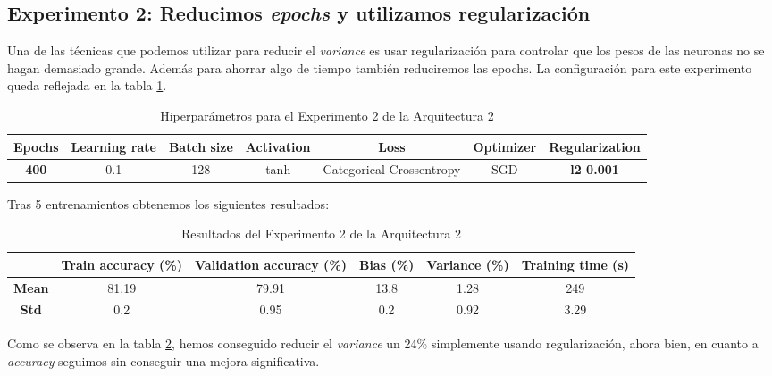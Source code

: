 \documentclass{article}
\begin{document}
			\newpage
			
			
		\subsection{Experimento 2: Reducimos \textit{epochs} y utilizamos regularizaci\'on}
		\label{d-s-a2-e2}
			Una de las t\'ecnicas que podemos utilizar para reducir el \textit{variance} es usar regularizaci\'on para controlar que los pesos de las neuronas no se hagan demasiado grande. Adem\'as para ahorrar algo de tiempo tambi\'en reduciremos las epochs. La configuraci\'on para este experimento queda reflejada en la tabla \ref{tab:hip-d-a2-e2}.
			\begin{table}[!h]
				\begin{center}
					\begin{tabular}{| c | c | c | c | c | c | c |}
						\textbf{Epochs} & \textbf{Learning rate} & \textbf{Batch size} & \textbf{Activation} & \textbf{Loss} & \textbf{Optimizer} & \textbf{Regularization} \\ \hline
						\textbf{400} & 0.1 & 128 & tanh & Categorical Crossentropy & SGD & \textbf{l2 0.001}
					\end{tabular}
					\caption{Hiperpar\'ametros para el Experimento 2 de la Arquitectura 2}
					\label{tab:hip-d-a2-e2}
				\end{center}
			\end{table}
			
			Tras 5 entrenamientos obtenemos los siguientes resultados:
			
			\begin{table}[!h]
				\begin{center}
					\begin{tabular}{ c | c | c | c | c | c |}
						\ & \textbf{Train accuracy (\%)} & \textbf{Validation accuracy (\%)} & \textbf{Bias (\%)} & \textbf{Variance (\%)} & \textbf{Training time (s)} \\ \hline
						\textbf{Mean} & 81.19 & 79.91 & 13.8 & 1.28 & 249\\ \hline
						\textbf{Std} & 0.2 & 0.95 & 0.2 & 0.92 & 3.29 \\ \hline
					\end{tabular}
					\caption{Resultados del Experimento 2 de la Arquitectura 2}
					\label{tab:res-d-a2-e2}
				\end{center}
			\end{table}
			
			Como se observa en la tabla \ref{tab:res-d-a2-e2}, hemos conseguido reducir el \textit{variance} un 24\% simplemente usando regularizaci\'on, ahora bien, en cuanto a \textit{accuracy} seguimos sin conseguir una mejora significativa.
			
\end{document}
